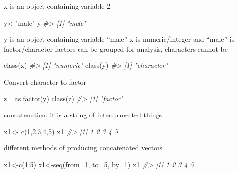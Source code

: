 \documentclass[
]{article}
\newenvironment{Shaded}{\begin{snugshade}}{\end{snugshade}}
\newcommand{\AttributeTok}[1]{\textcolor[rgb]{0.77,0.63,0.00}{#1}}
\newcommand{\CommentTok}[1]{\textcolor[rgb]{0.56,0.35,0.01}{\textit{#1}}}
\newcommand{\DecValTok}[1]{\textcolor[rgb]{0.00,0.00,0.81}{#1}}
\newcommand{\FunctionTok}[1]{\textcolor[rgb]{0.00,0.00,0.00}{#1}}
\newcommand{\NormalTok}[1]{#1}
\newcommand{\OtherTok}[1]{\textcolor[rgb]{0.56,0.35,0.01}{#1}}
\newcommand{\SpecialCharTok}[1]{\textcolor[rgb]{0.00,0.00,0.00}{#1}}
\newcommand{\StringTok}[1]{\textcolor[rgb]{0.31,0.60,0.02}{#1}}
\begin{document}
x is an object containing variable 2

\begin{Shaded}
\begin{Highlighting}[]
\NormalTok{y}\OtherTok{\textless{}{-}}\StringTok{"male"}
\NormalTok{y}
\CommentTok{\#\textgreater{} [1] "male"}
\end{Highlighting}
\end{Shaded}

y is an object containing variable ``male''
x is numeric/integer and ``male'' is factor/character
factors can be grouped for analysis, characters cannot be

\begin{Shaded}
\begin{Highlighting}[]
\FunctionTok{class}\NormalTok{(x)}
\CommentTok{\#\textgreater{} [1] "numeric"}
\FunctionTok{class}\NormalTok{(y)}
\CommentTok{\#\textgreater{} [1] "character"}
\end{Highlighting}
\end{Shaded}

Convert character to factor

\begin{Shaded}
\begin{Highlighting}[]
\NormalTok{z}\OtherTok{=} \FunctionTok{as.factor}\NormalTok{(y)}
\FunctionTok{class}\NormalTok{(z)}
\CommentTok{\#\textgreater{} [1] "factor"}
\end{Highlighting}
\end{Shaded}

concatenation: it is a string of interconnected things

\begin{Shaded}
\begin{Highlighting}[]
\NormalTok{x1}\OtherTok{\textless{}{-}} \FunctionTok{c}\NormalTok{(}\DecValTok{1}\NormalTok{,}\DecValTok{2}\NormalTok{,}\DecValTok{3}\NormalTok{,}\DecValTok{4}\NormalTok{,}\DecValTok{5}\NormalTok{)}
\NormalTok{x1}
\CommentTok{\#\textgreater{} [1] 1 2 3 4 5}
\end{Highlighting}
\end{Shaded}

different methods of producing concatenated vectors

\begin{Shaded}
\begin{Highlighting}[]
\NormalTok{x1}\OtherTok{\textless{}{-}}\FunctionTok{c}\NormalTok{(}\DecValTok{1}\SpecialCharTok{:}\DecValTok{5}\NormalTok{)}
\NormalTok{x1}\OtherTok{\textless{}{-}}\FunctionTok{seq}\NormalTok{(}\AttributeTok{from=}\DecValTok{1}\NormalTok{, }\AttributeTok{to=}\DecValTok{5}\NormalTok{, }\AttributeTok{by=}\DecValTok{1}\NormalTok{)}
\NormalTok{x1}
\CommentTok{\#\textgreater{} [1] 1 2 3 4 5}
\end{Highlighting}
\end{Shaded}
\end{document}
